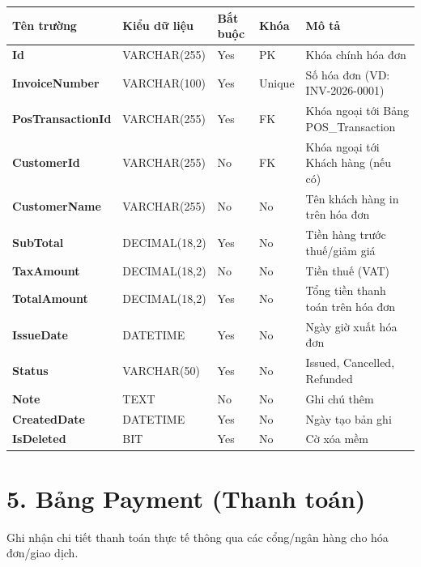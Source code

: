 \documentclass[11pt,a4paper]{article}
\begin{document}
	\begin{tabularx}{\textwidth}{|>{\bfseries}p{3.5cm}|p{2.5cm}|p{1.5cm}|p{1.8cm}|X|}
		\hline
		\rowcolor{tablehead} Tên trường & Kiểu dữ liệu & Bắt buộc & Khóa & Mô tả \\ \hline
		Id & VARCHAR(255) & Yes & PK & Khóa chính hóa đơn \\ \hline
		InvoiceNumber & VARCHAR(100) & Yes & Unique & Số hóa đơn (VD: INV-2026-0001) \\ \hline
		PosTransactionId & VARCHAR(255) & Yes & FK & Khóa ngoại tới Bảng POS\_Transaction \\ \hline
		CustomerId & VARCHAR(255) & No & FK & Khóa ngoại tới Khách hàng (nếu có) \\ \hline
		CustomerName & VARCHAR(255) & No & No & Tên khách hàng in trên hóa đơn \\ \hline
		SubTotal & DECIMAL(18,2) & Yes & No & Tiền hàng trước thuế/giảm giá \\ \hline
		TaxAmount & DECIMAL(18,2) & No & No & Tiền thuế (VAT) \\ \hline
		TotalAmount & DECIMAL(18,2) & Yes & No & Tổng tiền thanh toán trên hóa đơn \\ \hline
		IssueDate & DATETIME & Yes & No & Ngày giờ xuất hóa đơn \\ \hline
		Status & VARCHAR(50) & Yes & No & Issued, Cancelled, Refunded \\ \hline
		Note & TEXT & No & No & Ghi chú thêm \\ \hline
		CreatedDate & DATETIME & Yes & No & Ngày tạo bản ghi \\ \hline
		IsDeleted & BIT & Yes & No & Cờ xóa mềm \\ \hline
	\end{tabularx}
	
	\newpage
	
	\section{5. Bảng Payment (Thanh toán)}
	Ghi nhận chi tiết thanh toán thực tế thông qua các cổng/ngân hàng cho hóa đơn/giao dịch.
	
\end{document}
